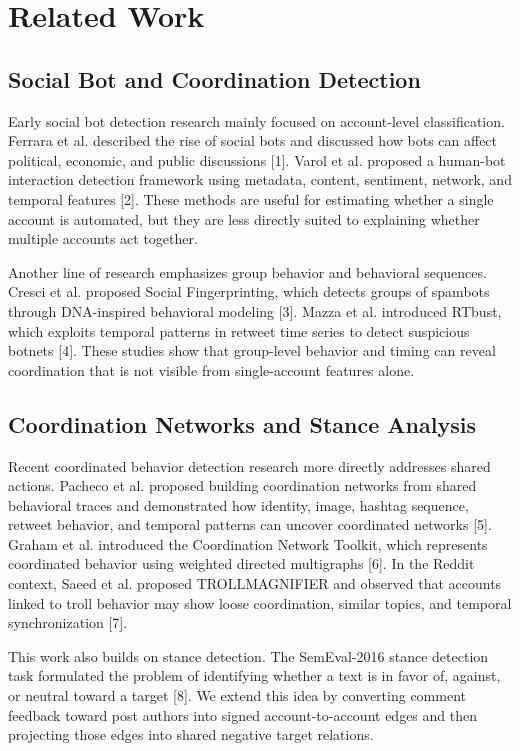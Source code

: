 \documentclass[conference]{IEEEtran}
\begin{document}
\section{Related Work}

\subsection{Social Bot and Coordination Detection}

Early social bot detection research mainly focused on account-level classification. Ferrara et al. described the rise of social bots and discussed how bots can affect political, economic, and public discussions [1]. Varol et al. proposed a human-bot interaction detection framework using metadata, content, sentiment, network, and temporal features [2]. These methods are useful for estimating whether a single account is automated, but they are less directly suited to explaining whether multiple accounts act together.

Another line of research emphasizes group behavior and behavioral sequences. Cresci et al. proposed Social Fingerprinting, which detects groups of spambots through DNA-inspired behavioral modeling [3]. Mazza et al. introduced RTbust, which exploits temporal patterns in retweet time series to detect suspicious botnets [4]. These studies show that group-level behavior and timing can reveal coordination that is not visible from single-account features alone.

\subsection{Coordination Networks and Stance Analysis}

Recent coordinated behavior detection research more directly addresses shared actions. Pacheco et al. proposed building coordination networks from shared behavioral traces and demonstrated how identity, image, hashtag sequence, retweet behavior, and temporal patterns can uncover coordinated networks [5]. Graham et al. introduced the Coordination Network Toolkit, which represents coordinated behavior using weighted directed multigraphs [6]. In the Reddit context, Saeed et al. proposed TROLLMAGNIFIER and observed that accounts linked to troll behavior may show loose coordination, similar topics, and temporal synchronization [7].

This work also builds on stance detection. The SemEval-2016 stance detection task formulated the problem of identifying whether a text is in favor of, against, or neutral toward a target [8]. We extend this idea by converting comment feedback toward post authors into signed account-to-account edges and then projecting those edges into shared negative target relations.
\end{document}
